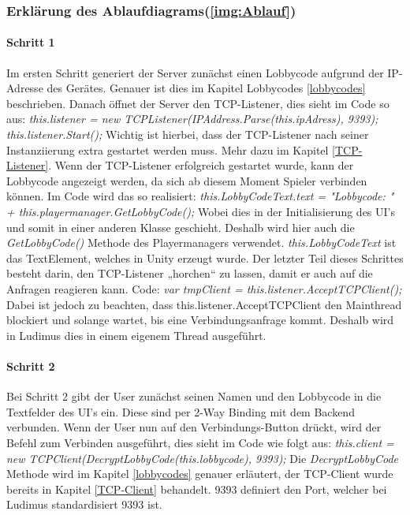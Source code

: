 \subsubsection{Erklärung des Ablaufdiagrams(\ref{img:Ablauf})}
\paragraph{Schritt 1}
Im ersten Schritt generiert der Server zunächst einen Lobbycode aufgrund der IP-Adresse des Gerätes.
Genauer ist dies im Kapitel Lobbycodes \ref{lobbycodes} beschrieben. Danach öffnet der Server den TCP-Listener, dies sieht im Code so aus:
\newline \textit{ this.listener = new TCPListener(IPAddress.Parse(this.ipAdress), 9393);\newline
this.listener.Start();}\newline
Wichtig ist hierbei, dass der TCP-Listener nach seiner Instanziierung extra gestartet werden muss. Mehr dazu im Kapitel \ref{TCP-Listener}. Wenn der TCP-Listener erfolgreich gestartet wurde, kann der Lobbycode angezeigt werden, da sich ab diesem Moment Spieler verbinden können. Im Code wird das so realisiert: \newline
\textit{this.LobbyCodeText.text = "Lobbycode: " + this.playermanager.GetLobbyCode();}\newline
Wobei dies in der Initialisierung des UI's und somit in einer anderen Klasse geschieht. Deshalb wird hier auch die
\textit{GetLobbyCode()} Methode des Playermanagers verwendet. \textit{this.LobbyCodeText} ist das TextElement, welches in Unity erzeugt wurde.
Der letzter Teil dieses Schrittes besteht darin, den TCP-Listener „horchen“ zu lassen, damit er auch auf die Anfragen reagieren kann. Code: \newline
\textit{ var tmpClient = this.listener.AcceptTCPClient();} \newline
Dabei ist jedoch zu beachten, dass this.listener.AcceptTCPClient den Mainthread blockiert und solange wartet, bis eine Verbindungsanfrage kommt. Deshalb wird in Ludimus dies in einem eigenem Thread ausgeführt.
\paragraph{Schritt 2}
Bei Schritt 2 gibt der User zunächst seinen Namen und den Lobbycode in die Textfelder des UI's ein. Diese sind per 2-Way Binding mit dem Backend verbunden.
Wenn der User nun auf den Verbindungs-Button drückt, wird der Befehl zum Verbinden ausgeführt, dies sieht im Code wie folgt aus: \newline
\textit{this.client = new TCPClient(DecryptLobbyCode(this.lobbycode), 9393);} \newline
Die \textit{DecryptLobbyCode} Methode wird im Kapitel \ref{lobbycodes} genauer erläutert, der TCP-Client wurde bereits in Kapitel \ref{TCP-Client} behandelt. 9393 definiert den Port, welcher bei Ludimus standardisiert 9393 ist.
